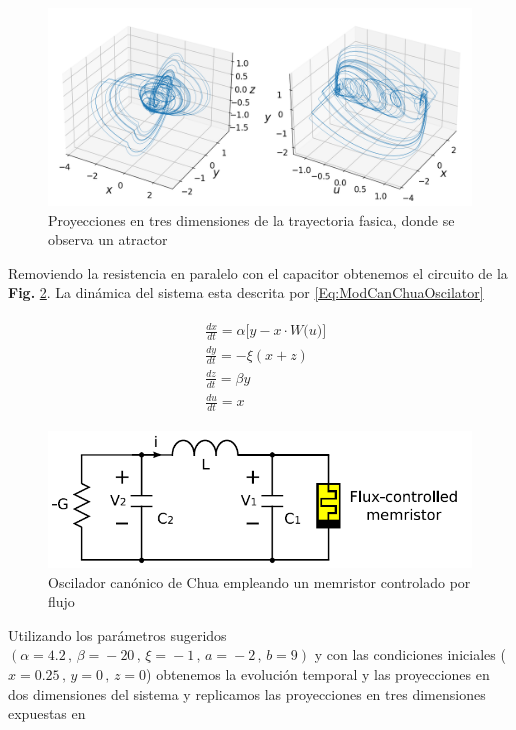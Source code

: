 \documentclass[11pt,letterpaper]{article}
\begin{document}
\begin{multicols*}{2}
\begin{figure}[H]
    \includegraphics[scale=0.32]{Memristor-basedCanonicalChuaOscillator3D.png}
    \caption{Proyecciones en tres dimensiones de la trayectoria fasica, donde se observa un atractor}
    \label{Fig:MemCanChuaOscilator3D}
\end{figure}

Removiendo la resistencia en paralelo con el capacitor obtenemos el circuito de la \textbf{Fig.} \ref{Fig:ModCanChuaOscilator}. La dinámica del sistema esta descrita por \ref{Eq:ModCanChuaOscilator}

\begin{align}
\begin{split}
\label{Eq:ModCanChuaOscilator}
&\frac{dx}{dt} = \alpha\bigg[y - x\cdot W\big(u\big)\bigg] \\ 
&\frac{dy}{dt} = -\xi(x+z)  \\
&\frac{dz}{dt} = \beta y  \\
&\frac{du}{dt} = x
\end{split}
\end{align}


\begin{figure}[H]
    \centering
    \includegraphics[scale=0.25]{MemCanChuaOscilator.png}
    \caption{Oscilador canónico de Chua empleando un memristor controlado por flujo \cite{Itoh2008}}
    \label{Fig:ModCanChuaOscilator}
\end{figure}

Utilizando los parámetros sugeridos $(\alpha\!=\!4.2 \,,\, \beta\!=\!-20 \,,\, \xi\!=\!-1 \,,\,a\!=\!-2 \,,\, b\!=\!9)$ y con las condiciones iniciales ($x\!=\!0.25\,,\,y\!=\!0\,,\,z\!=\!0$) obtenemos la evolución temporal y las proyecciones en dos dimensiones del sistema y replicamos las proyecciones en tres dimensiones expuestas en \cite{Itoh2008} 


\end{multicols*}
\end{document}

